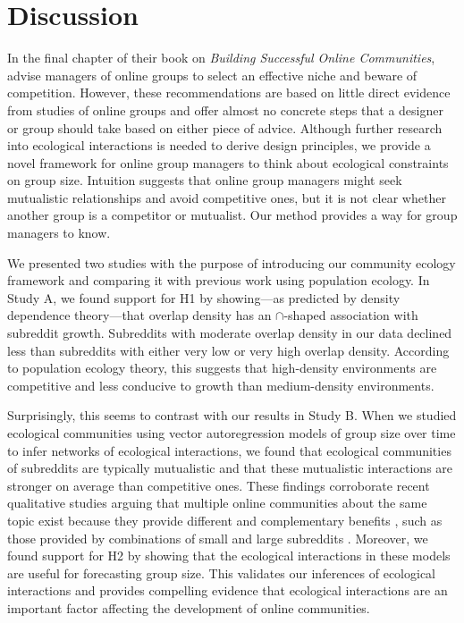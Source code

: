 \documentclass[letterpaper]{article}\usepackage[]{graphicx}\usepackage[]{color}
\begin{document}
\section{Discussion}
\label{sec:discussion}
In the final chapter of their book on \textit{Building Successful Online Communities}, \citet{kraut_building_2012} advise managers of online groups to select an effective niche and beware of competition. However, these recommendations are based on little direct evidence from studies of online groups and offer almost no concrete steps that a designer or group should take based on either piece of advice. Although further research into ecological interactions is needed to derive design principles, we provide a novel framework for online group managers to think about ecological constraints on group size. 
Intuition suggests that online group managers might seek mutualistic relationships and avoid competitive ones, but it is not clear whether another group is a competitor or mutualist. Our method provides a way for group managers to know. 

We presented two studies with the purpose of introducing our community ecology framework and comparing it with previous work using population ecology.
In Study A, we found support for H1 by showing---as predicted by density dependence theory---that overlap density has an $\cap$-shaped association with subreddit growth.
Subreddits with moderate overlap density in our data declined less than subreddits with either very low or very high overlap density. According to population ecology theory, this suggests that high-density environments are competitive and less conducive to growth than medium-density environments.

Surprisingly, this seems to contrast with our results in Study B. When we studied ecological communities using vector autoregression models of group size over time to infer networks of ecological interactions, 
we found that ecological communities of subreddits are typically mutualistic and that these mutualistic interactions are stronger on average than competitive ones.
These findings corroborate recent qualitative studies arguing that multiple online communities about the same topic exist because they provide different and complementary benefits \cite{teblunthuis_no_2022}, such as those provided by combinations of small and large subreddits \cite{hwang_why_2021}.
Moreover, we found support for H2 by showing that the ecological interactions in these models are useful for forecasting group size. This validates our inferences of ecological interactions and provides compelling evidence that ecological interactions are an important factor affecting the development of online communities. 
\end{document}
